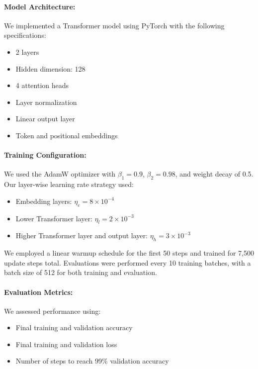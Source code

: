 \documentclass{article} %
\begin{document}
\paragraph{Model Architecture:} We implemented a Transformer model \cite{vaswani2017attention} using PyTorch \cite{paszke2019pytorch} with the following specifications:
\begin{itemize}
    \item 2 layers
    \item Hidden dimension: 128
    \item 4 attention heads
    \item Layer normalization \cite{ba2016layer}
    \item Linear output layer
    \item Token and positional embeddings
\end{itemize}

\paragraph{Training Configuration:} We used the AdamW optimizer \cite{loshchilov2017adamw} with $\beta_1 = 0.9$, $\beta_2 = 0.98$, and weight decay of 0.5. Our layer-wise learning rate strategy used:
\begin{itemize}
    \item Embedding layers: $\eta_e = 8 \times 10^{-4}$
    \item Lower Transformer layer: $\eta_l = 2 \times 10^{-3}$
    \item Higher Transformer layer and output layer: $\eta_h = 3 \times 10^{-3}$
\end{itemize}
We employed a linear warmup schedule for the first 50 steps and trained for 7,500 update steps total. Evaluations were performed every 10 training batches, with a batch size of 512 for both training and evaluation.

\paragraph{Evaluation Metrics:} We assessed performance using:
\begin{itemize}
    \item Final training and validation accuracy
    \item Final training and validation loss
    \item Number of steps to reach 99\% validation accuracy
\end{itemize}
\end{document}
